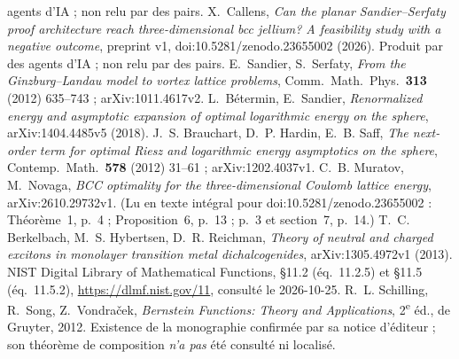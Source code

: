 agents d'IA ; non relu par des pairs.
 X.~Callens, \emph{Can the planar Sandier--Serfaty proof architecture reach three-dimensional bcc
jellium? A feasibility study with a negative outcome}, preprint v1, doi\string:10.5281/zenodo.23655002 (2026). Produit par des
agents d'IA ; non relu par des pairs.
 E.~Sandier, S.~Serfaty, \emph{From the Ginzburg--Landau model to vortex lattice problems}, Comm.\ Math.\
Phys.\ \textbf{313} (2012) 635--743 ; arXiv:1011.4617v2.
 L.~B\'etermin, E.~Sandier, \emph{Renormalized energy and asymptotic expansion of optimal logarithmic
energy on the sphere}, arXiv:1404.4485v5 (2018).
 J.~S. Brauchart, D.~P. Hardin, E.~B. Saff, \emph{The next-order term for optimal Riesz and logarithmic
energy asymptotics on the sphere}, Contemp.\ Math.\ \textbf{578} (2012) 31--61 ; arXiv:1202.4037v1.
\bibitem{ch2mn} C.~B. Muratov, M.~Novaga, \emph{BCC optimality for the three-dimensional Coulomb lattice energy}, arXiv:2610.29732v1. (Lu en texte intégral pour doi\string:10.5281/zenodo.23655002 :
Théorème~1, p.~4 ; Proposition~6, p.~13 ; p.~3 et section~7, p.~14.)
\bibitem{ch2bhr} T.~C. Berkelbach, M.~S. Hybertsen, D.~R. Reichman, \emph{Theory of neutral and charged excitons in
monolayer transition metal dichalcogenides}, arXiv:1305.4972v1 (2013).
\bibitem{ch2dlmf} NIST Digital Library of Mathematical Functions, \S11.2 (éq.~11.2.5) et \S11.5 (éq.~11.5.2),
\url{https://dlmf.nist.gov/11}, consulté le 2026-10-25.
 R.~L. Schilling, R.~Song, Z.~Vondra\v{c}ek, \emph{Bernstein Functions: Theory and Applications},
2\textsuperscript{e} éd., de Gruyter, 2012. Existence de la monographie confirmée par sa notice d'éditeur ; son théorème
de composition \emph{n'a pas} été consulté ni localisé.
